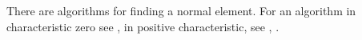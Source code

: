\documentclass{article}
\theoremstyle{plain}
\theoremstyle{definition}
\begin{document}
\noindent
There are algorithms for finding a normal element. For an algorithm in characteristic zero see \cite{Girstmair}, in positive characteristic, see \cite{Giesbrecht} , \cite{Poli}. 
\end{document}
